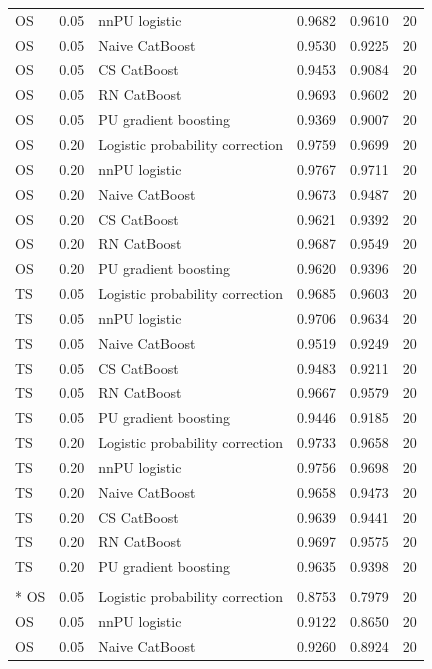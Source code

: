 \begin{longtable}{@{}p{0.65in}rp{2.85in}rrr@{}}
OS & 0.05 & nnPU logistic & 0.9682 & 0.9610 & 20 \\
OS & 0.05 & Naive CatBoost & 0.9530 & 0.9225 & 20 \\
OS & 0.05 & CS CatBoost & 0.9453 & 0.9084 & 20 \\
OS & 0.05 & RN CatBoost & 0.9693 & 0.9602 & 20 \\
OS & 0.05 & PU gradient boosting & 0.9369 & 0.9007 & 20 \\
\addlinespace[2pt]
OS & 0.20 & Logistic probability correction & 0.9759 & 0.9699 & 20 \\
OS & 0.20 & nnPU logistic & 0.9767 & 0.9711 & 20 \\
OS & 0.20 & Naive CatBoost & 0.9673 & 0.9487 & 20 \\
OS & 0.20 & CS CatBoost & 0.9621 & 0.9392 & 20 \\
OS & 0.20 & RN CatBoost & 0.9687 & 0.9549 & 20 \\
OS & 0.20 & PU gradient boosting & 0.9620 & 0.9396 & 20 \\
\addlinespace[2pt]
TS & 0.05 & Logistic probability correction & 0.9685 & 0.9603 & 20 \\
TS & 0.05 & nnPU logistic & 0.9706 & 0.9634 & 20 \\
TS & 0.05 & Naive CatBoost & 0.9519 & 0.9249 & 20 \\
TS & 0.05 & CS CatBoost & 0.9483 & 0.9211 & 20 \\
TS & 0.05 & RN CatBoost & 0.9667 & 0.9579 & 20 \\
TS & 0.05 & PU gradient boosting & 0.9446 & 0.9185 & 20 \\
\addlinespace[2pt]
TS & 0.20 & Logistic probability correction & 0.9733 & 0.9658 & 20 \\
TS & 0.20 & nnPU logistic & 0.9756 & 0.9698 & 20 \\
TS & 0.20 & Naive CatBoost & 0.9658 & 0.9473 & 20 \\
TS & 0.20 & CS CatBoost & 0.9639 & 0.9441 & 20 \\
TS & 0.20 & RN CatBoost & 0.9697 & 0.9575 & 20 \\
TS & 0.20 & PU gradient boosting & 0.9635 & 0.9398 & 20 \\
\addlinespace[2pt]
\multicolumn{6}{l}{\textbf{Spambase}}\\*
OS & 0.05 & Logistic probability correction & 0.8753 & 0.7979 & 20 \\
OS & 0.05 & nnPU logistic & 0.9122 & 0.8650 & 20 \\
OS & 0.05 & Naive CatBoost & 0.9260 & 0.8924 & 20 \\

\end{longtable}

